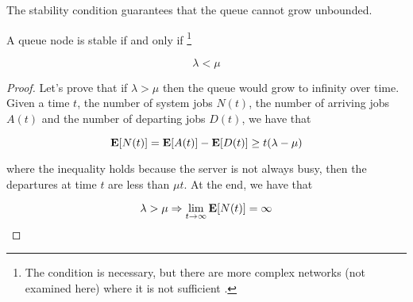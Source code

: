 The stability condition guarantees that the queue cannot grow unbounded.

\begin{theorem}
\label{thm:Stability}
	A queue node is stable if and only if \footnote{The condition is necessary, but there are more complex networks (not examined here) where it is not sufficient \cite{bramson2008stability}.} 
	
	\begin{equation}
	\label{eqn:Stability}
	\lambda < \mu
	\end{equation}
	
	\begin{proof}
		Let's prove that if $\lambda > \mu$ then the queue would grow to infinity over time.		
		Given a time $t$, the number of system jobs $N(t)$, the number of arriving jobs $A(t)$ and the number of departing jobs $D(t)$, we have that
		
		\begin{equation*}
		\mathbf{E}[N(t)]=\mathbf{E}[A(t)]-\mathbf{E}[D(t)] \geq t(\lambda - \mu)
		\end{equation*}
		
		where the inequality holds because the server is not always busy, then the departures at time $t$ are less than $\mu t$. 
		At the end, we have that
		
		\begin{equation*}
		\lambda > \mu \Rightarrow \lim_{t \to \infty} \mathbf{E}[N(t)] = \infty
		\end{equation*}
	\end{proof}
\end{theorem}